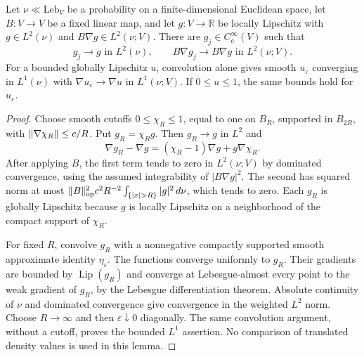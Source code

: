 \begin{lemma}
  \label{lem:covariance-test-core-density}
  \leanok
  Let $\nu\ll\mathrm{Leb}_V$ be a probability on a finite-dimensional Euclidean space, let
  $B:V\to V$ be a fixed linear map, and let $g:V\to\mathbb R$ be locally Lipschitz with
  $g\in L^2(\nu)$ and $B\nabla g\in L^2(\nu;V)$. There are $g_j\in C_c^\infty(V)$ such that
  \[
    g_j\longrightarrow g\text{ in }L^2(\nu),\qquad
    B\nabla g_j\longrightarrow B\nabla g\text{ in }L^2(\nu;V).
  \]
  For a bounded globally Lipschitz $u$, convolution alone gives smooth $u_\varepsilon$ converging
  in $L^1(\nu)$ with $\nabla u_\varepsilon\to\nabla u$ in $L^1(\nu;V)$.
  If $0\le u\le1$, the same bounds hold for $u_\varepsilon$.
\end{lemma}
\begin{proof}
  \leanok
  Choose smooth cutoffs $0\le\chi_R\le1$, equal to one on $B_R$, supported in $B_{2R}$, with
  $\lVert\nabla\chi_R\rVert\le c/R$. Put $g_R=\chi_Rg$. Then $g_R\to g$ in $L^2$ and
  \[
    \nabla g_R-\nabla g=(\chi_R-1)\nabla g+g\nabla\chi_R.
  \]
  After applying $B$, the first term tends to zero in $L^2(\nu;V)$ by dominated convergence,
  using the assumed integrability of $|B\nabla g|^2$. The second has squared norm at most
  $\norm{B}_\op^2c^2R^{-2}\int_{\{|x|>R\}}|g|^2\,d\nu$, which tends to zero.
  Each $g_R$ is globally Lipschitz because $g$ is locally Lipschitz on a neighborhood of
  the compact support of $\chi_R$.

  For fixed $R$, convolve $g_R$ with a nonnegative compactly supported smooth approximate
  identity $\eta_\varepsilon$. The functions converge uniformly to $g_R$. Their gradients are
  bounded by $\operatorname{Lip}(g_R)$ and converge at Lebesgue-almost every point to the weak
  gradient of $g_R$, by the Lebesgue differentiation theorem. Absolute continuity of $\nu$
  and dominated convergence give convergence in the weighted $L^2$ norm. Choose $R\to\infty$
  and then $\varepsilon\downarrow0$ diagonally. The same convolution argument, without a
  cutoff, proves the bounded $L^1$ assertion. No comparison of translated density values is
  used in this lemma.
\end{proof}

